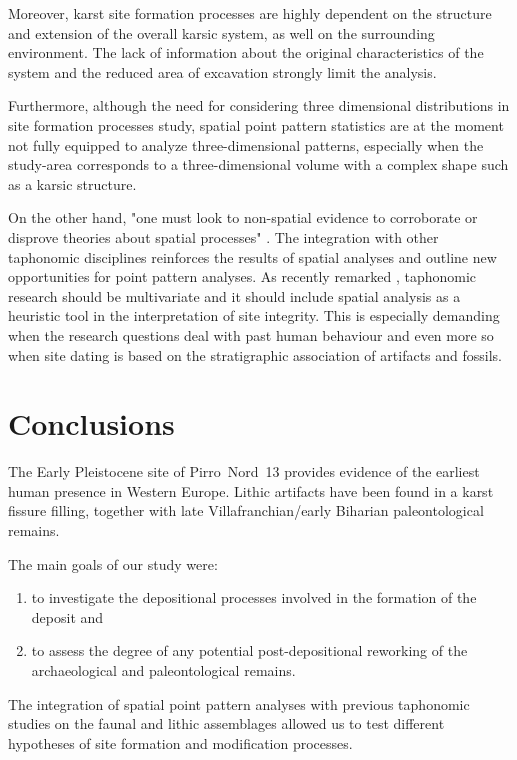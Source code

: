 \documentclass[review,authoryear]{elsarticle} %
\begin{document}
Moreover, karst site formation processes are highly dependent on the structure and extension of the overall karsic system, as well on the surrounding environment. The lack of information about the original characteristics of the system and the reduced area of excavation strongly limit the analysis.

Furthermore, although the need for considering three dimensional distributions in site formation processes study, spatial point pattern statistics are at the moment not fully equipped to analyze three-dimensional patterns, especially when the study-area corresponds to a three-dimensional volume with a complex shape such as a karsic structure.

On the other hand, "one must look to non-spatial evidence to corroborate or disprove theories about spatial processes" \citep[p.~8]{Hodder1976}. The integration with other taphonomic disciplines reinforces the results of spatial analyses and outline new opportunities for point pattern analyses. As recently remarked \citep{Cobo-Sanchez2014}, taphonomic research should be multivariate \citep{Dominguez-Rodrigo2010} and it should include spatial analysis as a heuristic tool in the interpretation of site integrity. This is especially demanding when the research questions deal with past human behaviour and even more so when site dating is based on the stratigraphic association of artifacts and fossils.

\section{Conclusions}

The Early Pleistocene site of Pirro~Nord~13 provides evidence of the earliest human presence in Western Europe. Lithic artifacts have been found in a karst fissure filling, together with late Villafranchian/early Biharian paleontological remains.

The main goals of our study were:
\begin{enumerate}
  \item to investigate the depositional processes involved in the formation of the deposit and
  \item to assess the degree of any potential post-depositional reworking of the archaeological and paleontological remains.
\end{enumerate}

The integration of spatial point pattern analyses with previous taphonomic studies on the faunal and lithic assemblages allowed us to test different hypotheses of site formation and modification processes.
\end{document}
